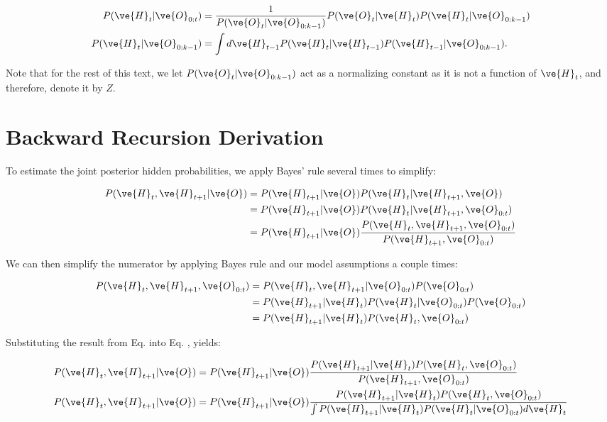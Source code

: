 \documentclass{article}
\begin{document}
\begin{align} \label{app_eq:chap_tol}
P(\ve{H}_t|\ve{O}_{0:t}) &= \frac{1}{P(\ve{O}_t | \ve{O}_{0:k-1})} P(\ve{O}_t|\ve{H}_t) P(\ve{H}_t|\ve{O}_{0:k-1}) \\
P(\ve{H}_t|\ve{O}_{0:k-1}) &= \int d\ve{H}_{t-1} P(\ve{H}_t|\ve{H}_{t-1}) P(\ve{H}_{t-1} | \ve{O}_{0:k-1}).
\end{align}

\noindent Note that for the rest of this text, we let $P(\ve{O}_t | \ve{O}_{0:k-1})$ act as a normalizing constant as it is not a function of $\ve{H}_t$, and therefore, denote it by $Z$.

\section{Backward Recursion Derivation} \label{sec:bact}

To estimate the joint posterior hidden probabilities, we apply Bayes' rule several times to simplify:


\begin{subequations}
\begin{align}
P(\ve{H}_t, \ve{H}_{t+1} | \ve{O}) &= P(\ve{H}_{t+1} | \ve{O}) P(\ve{H}_t | \ve{H}_{t+1}, \ve{O}) \\
&=P(\ve{H}_{t+1} | \ve{O}) P(\ve{H}_t | \ve{H}_{t+1}, \ve{O}_{0:t}) \\
&=P(\ve{H}_{t+1} | \ve{O}) \frac{P(\ve{H}_t, \ve{H}_{t+1}, \ve{O}_{0:t})}{P(\ve{H}_{t+1}, \ve{O}_{0:t})} \label{eq:subber}
\end{align}
\end{subequations}

\noindent We can then simplify the numerator by applying Bayes rule and our model assumptions a couple times:

\begin{subequations}
\begin{align}
P(\ve{H}_t, \ve{H}_{t+1}, \ve{O}_{0:t}) &= P(\ve{H}_t, \ve{H}_{t+1} | \ve{O}_{0:t}) P(\ve{O}_{0:t}) \\
&=P(\ve{H}_{t+1} | \ve{H}_t) P(\ve{H}_t | \ve{O}_{0:t}) P(\ve{O}_{0:t}) \\
&=P(\ve{H}_{t+1} | \ve{H}_t) P(\ve{H}_t, \ve{O}_{0:t}) \label{eq:numer}
\end{align}
\end{subequations}

\noindent Substituting the result from Eq. \label{eq:numer} into Eq. \label{eq:subber}, yields:

\begin{subequations}
\begin{align}
P(\ve{H}_t, \ve{H}_{t+1} | \ve{O}) &= P(\ve{H}_{t+1} | \ve{O}) \frac{ P(\ve{H}_{t+1} | \ve{H}_t) P(\ve{H}_t, \ve{O}_{0:t})}{P(\ve{H}_{t+1} , \ve{O}_{0:t})} \\
 P(\ve{H}_t, \ve{H}_{t+1} | \ve{O}) &= P(\ve{H}_{t+1} | \ve{O}) \frac{ P(\ve{H}_{t+1} | \ve{H}_t) P(\ve{H}_t, \ve{O}_{0:t})}{\int P(\ve{H}_{t+1} | \ve{H}_t) P(\ve{H}_t | \ve{O}_{0:t}) d\ve{H}_t} 
\end{align}
\end{subequations}
\end{document}
